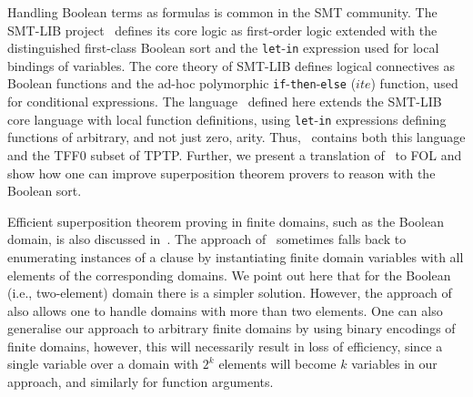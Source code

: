 Handling Boolean terms as formulas is common in the SMT community. The SMT-LIB project~\cite{SMT-LIB} defines its core logic as first-order logic extended with the distinguished first-class Boolean sort and the \verb'let'-\verb'in' expression used for local bindings of variables. The core theory of SMT-LIB defines logical connectives as Boolean functions and the ad-hoc polymorphic \verb'if'-\verb'then'-\verb'else' ($ite$) function, used for conditional expressions. 
The language \folb\ defined here extends the SMT-LIB core language with local function definitions,
using \verb'let'-\verb'in' expressions defining functions of arbitrary, and not just zero, arity. Thus, \folb\ contains both this language and the TFF0 subset of TPTP. Further, we present a translation of \folb\ to FOL and show how one can improve superposition theorem provers to reason with the Boolean sort. 


Efficient superposition theorem proving in finite domains, such as the Boolean domain, is also discussed in~\cite{HillenbrandWeidenbach13}. The approach of~\cite{HillenbrandWeidenbach13} sometimes falls back to enumerating instances of a clause by instantiating finite domain variables with all elements of the corresponding domains. We point out here that for the Boolean (i.e., two-element) domain there is a simpler solution. However, the approach of~\cite{HillenbrandWeidenbach13} also allows one to handle domains with more than two elements. One can also generalise our approach to arbitrary finite domains by using binary encodings of finite domains, however, this will necessarily result in loss of efficiency, since a single variable over a domain with $2^k$ elements will become $k$ variables in our approach, and similarly for function arguments.
